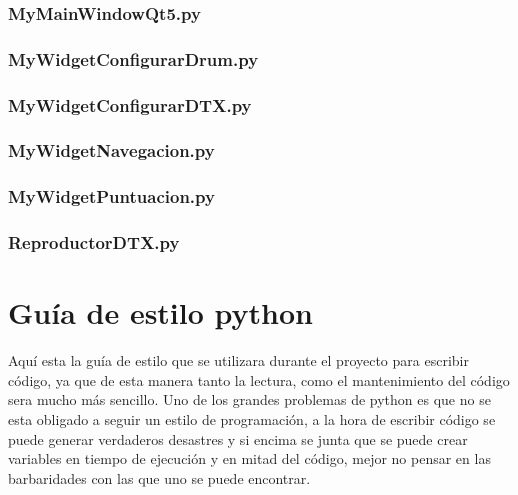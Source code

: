 \documentclass[a4paper,11pt,oneside]{book}
\begin{document}


\subsection{MyMainWindowQt5.py}



\subsection{MyWidgetConfigurarDrum.py}



\subsection{MyWidgetConfigurarDTX.py}



\subsection{MyWidgetNavegacion.py}



\subsection{MyWidgetPuntuacion.py}



\subsection{ReproductorDTX.py}




\chapter{Guía de estilo python}
Aquí esta la guía de estilo que se utilizara durante el proyecto para escribir código, ya que de esta manera tanto la lectura, como el mantenimiento del código sera mucho más sencillo.
Uno de los grandes problemas de python es que no se esta obligado a seguir un estilo de programación, a la hora de escribir código se puede generar verdaderos desastres y si encima se junta que se puede crear variables en tiempo de ejecución y en mitad del código, mejor no pensar en las barbaridades con las que uno se puede encontrar.
\end{document}

